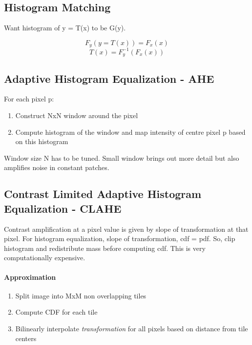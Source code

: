 \documentclass[a4paper,11pt]{article}
\begin{document}
\subsection{Histogram Matching}
Want histogram of y = T(x) to be G(y).

$$F_y(y = T(x)) = F_x(x)$$
$$T(x) = F_y^{-1}(F_x(x))$$


\subsection{Adaptive Histogram Equalization - AHE}
For each pixel p:
\begin{enumerate}
\item Construct NxN window around the pixel
\item Compute histogram of the window and map intensity of centre pixel p based on this histogram
\end{enumerate}
Window size N has to be tuned. Small window brings out more detail but also amplifies noise in constant patches.

\subsection{Contrast Limited Adaptive Histogram Equalization - CLAHE}
Contrast amplification at a pixel value is given by slope of transformation at that pixel. For histogram equalization, slope of transformation, cdf = pdf. So, clip histogram and redistribute mass before computing cdf.
This is very computationally expensive.
\vspace{-10pt}
\paragraph{Approximation}
\begin{enumerate}
\item Split image into MxM non overlapping tiles
\item Compute CDF for each tile
\item Bilinearly interpolate \textit{transformation} for all pixels based on distance from tile centers
\end{enumerate}
\end{document}
